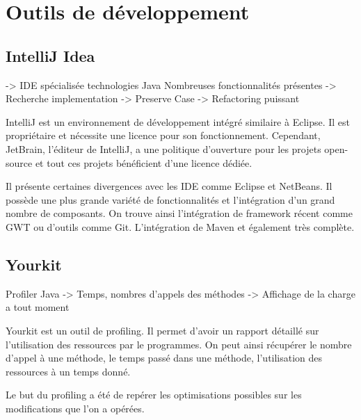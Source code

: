 \section{Outils de développement}
\subsection{IntelliJ Idea}
-> IDE spécialisée technologies Java
Nombreuses fonctionnalités présentes
-> Recherche implementation 
-> Preserve Case
-> Refactoring puissant

IntelliJ est un environnement de développement intégré similaire à Eclipse. Il est propriétaire et nécessite une licence pour son fonctionnement. Cependant, JetBrain, l'éditeur de IntelliJ, a une politique d'ouverture pour les projets open-source et tout ces projets bénéficient d'une licence dédiée.

Il présente certaines divergences avec les IDE comme Eclipse et NetBeans. Il possède une plus grande variété de fonctionnalités et l'intégration d'un grand nombre de composants. On trouve ainsi l'intégration de framework récent comme GWT ou d'outils comme Git. L'intégration de Maven et également très complète.
\subsection{Yourkit}
Profiler Java
-> Temps, nombres d'appels des méthodes
-> Affichage de la charge a tout moment

Yourkit est un outil de profiling. Il permet d'avoir un rapport détaillé sur l'utilisation des ressources par le programmes. On peut ainsi récupérer le nombre d'appel à une méthode, le temps passé dans une méthode, l'utilisation des ressources à un temps donné.

Le but du profiling a été de repérer les optimisations possibles sur les modifications que l'on a opérées.